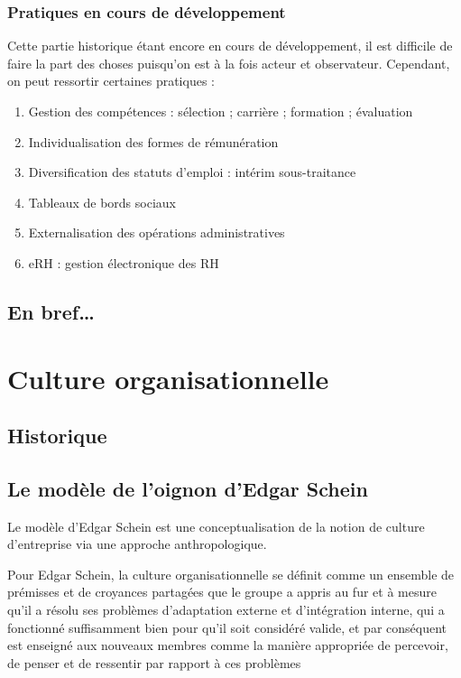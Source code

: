 \documentclass[12pt]{article}
\begin{document}
		\subsubsection{Pratiques en cours de développement}
		
		Cette partie historique étant encore en cours de développement, il est difficile de faire la part des choses puisqu'on est à la fois acteur et observateur. Cependant, on peut ressortir certaines pratiques :
		
		\begin{enumerate}
		 \item Gestion des compétences :
		    \subitem sélection ;
		    \subitem carrière ;
		    \subitem formation ;
		    \subitem évaluation
		 \item Individualisation des formes de rémunération
		 \item Diversification des statuts d'emploi :
		    \subitem intérim
		    \subitem sous-traitance
		 \item Tableaux de bords sociaux
		 \item Externalisation des opérations administratives
		 \item eRH : gestion électronique des RH
		\end{enumerate}

		
	\subsection{En bref\ldots}
	

\section{Culture organisationnelle}
	\subsection{Historique}
	\subsection{Le modèle de l'oignon d'Edgar Schein}
	
	Le modèle d'Edgar Schein est une conceptualisation de la notion de culture d'entreprise via une approche anthropologique.
	
	Pour Edgar Schein, la culture organisationnelle se définit comme \og{} un ensemble de prémisses et de croyances partagées que le groupe a appris au fur et à mesure qu'il a résolu ses problèmes d'adaptation externe et d'intégration interne, qui a fonctionné suffisamment bien pour qu'il soit considéré valide, et par conséquent est enseigné aux nouveaux membres comme la manière appropriée de percevoir, de penser et de ressentir par rapport à ces problèmes \fg{} \cite{schein2010}
	
\end{document}
